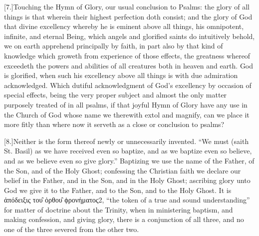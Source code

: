 [7.]Touching the Hymn of Glory, our usual conclusion to Psalms: the glory of all things is that wherein their highest perfection doth consist; and the glory of God that divine excellency whereby he is eminent above all things, his omnipotent, infinite, and eternal Being, which angels and glorified saints do intuitively behold, we on earth apprehend principally by faith, in part also by that kind of knowledge which groweth from experience of those effects, the greatness whereof exceedeth the powers and abilities of all creatures both in heaven and earth. God is glorified, when such his excellency above all things is with due admiration acknowledged. Which dutiful acknowledgment of God’s excellency by occasion of special effects, being the very proper subject and almost the only matter purposely treated of in all psalms, if that joyful Hymn of Glory have any use in the Church of God whose name we therewith extol and magnify, can we place it more fitly than where now it serveth as a close or conclusion to psalms?

[8.]Neither is the form thereof newly or unnecessarily  invented.
 “We must (saith St. Basil) as we have received even so baptize, and as we baptize even so believe, and as we believe even so give glory.” Baptizing we use the name of the Father, of the Son, and of the Holy Ghost; confessing the Christian faith we declare our belief in the Father, and in the Son, and in the Holy Ghost; ascribing glory unto God we give it to the Father, and to the Son, and to the Holy Ghost. It is ἀπόδειξις του̑ ὀρθου̑ ϕρονήματος2, “the token of a true and sound understanding” for matter of doctrine about the Trinity, when in ministering baptism, and making confession, and giving glory, there is a conjunction of all three, and no one of the three severed from the other two.

